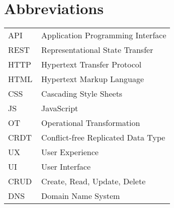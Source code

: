 \chapter*{Abbreviations}


\begin{flushleft}
\begin{tabular}{l p{0.8\linewidth}}
API      & Application Programming Interface\\
REST     & Representational State Transfer\\
HTTP     & Hypertext Transfer Protocol\\
HTML     & Hypertext Markup Language\\
CSS      & Cascading Style Sheets\\
JS       & JavaScript\\
OT       & Operational Transformation\\
CRDT     & Conflict-free Replicated Data Type\\
UX       & User Experience\\
UI       & User Interface\\
CRUD     & Create, Read, Update, Delete\\
DNS      & Domain Name System\\
\end{tabular}
\end{flushleft}

